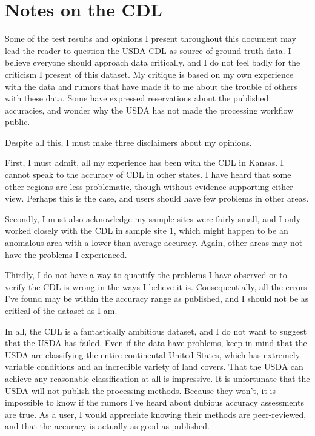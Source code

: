 \chapter{Notes on the CDL}
\label{appendix:cdl}

Some of the test results and opinions I present throughout this document may lead the reader to question the USDA CDL as source of ground truth data. I believe everyone should approach data critically, and I do not feel badly for the criticism I present of this dataset. My critique is based on my own experience with the data and rumors that have made it to me about the trouble of others with these data. Some have expressed reservations about the published accuracies, and wonder why the USDA has not made the processing workflow public.


Despite all this, I must make three disclaimers about my opinions.

First, I must admit, all my experience has been with the CDL in Kansas. I cannot speak to the accuracy of CDL in other states. I have heard that some other regions are less problematic, though without evidence supporting either view. Perhaps this is the case, and users should have few problems in other areas.

Secondly, I must also acknowledge my sample sites were fairly small, and I only worked closely with the CDL in sample site 1, which might happen to be an anomalous area with a lower-than-average accuracy. Again, other areas may not have the problems I experienced.

Thirdly, I do not have a way to quantify the problems I have observed or to verify the CDL is wrong in the ways I believe it is. Consequentially, all the errors I've found may be within the accuracy range as published, and I should not be as critical of the dataset as I am.

In all, the CDL is a fantastically ambitious dataset, and I do not want to suggest that the USDA has failed. Even if the data have problems, keep in mind that the USDA are classifying the entire continental United States, which has extremely variable conditions and an incredible variety of land covers. That the USDA can achieve any reasonable classification at all is impressive. It is unfortunate that the USDA will not publish the processing methods. Because they won't, it is impossible to know if the rumors I've heard about dubious accuracy assessments are true. As a user, I would appreciate knowing their methods are peer-reviewed, and that the accuracy is actually as good as published.